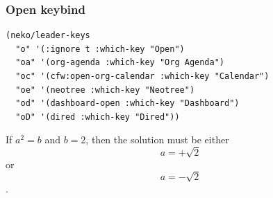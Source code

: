 \documentclass[11pt]{article}
\begin{document}
\subsubsection{Open keybind}
\label{sec:orga400886}

\begin{verbatim}
(neko/leader-keys
  "o" '(:ignore t :which-key "Open")
  "oa" '(org-agenda :which-key "Org Agenda")
  "oc" '(cfw:open-org-calendar :which-key "Calendar")
  "oe" '(neotree :which-key "Neotree")
  "od" '(dashboard-open :which-key "Dashboard")
  "oD" '(dired :which-key "Dired")) 
\end{verbatim}



If \(a^2=b\) and \(b=2\), then the solution must be
either $$ a=+\sqrt{2} $$ or \[ a=-\sqrt{2} \].
\end{document}
